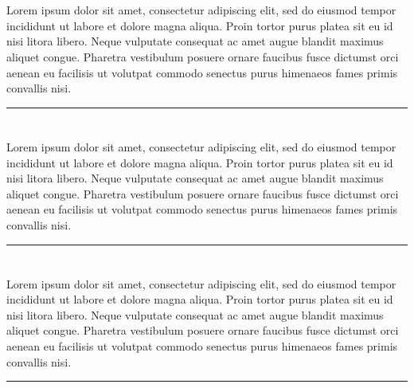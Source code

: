 \documentclass[12pt, letterpaper]{article}
\begin{document}
\section*{}
\noindent Lorem ipsum dolor sit amet, consectetur adipiscing elit, sed do eiusmod tempor incididunt ut labore et dolore magna aliqua. Proin tortor purus platea sit eu id nisi litora libero. Neque vulputate consequat ac amet augue blandit maximus aliquet congue. Pharetra vestibulum posuere ornare faucibus fusce dictumst orci aenean eu facilisis ut volutpat commodo senectus purus himenaeos fames primis convallis nisi\cite{9494653}.

\rule{\textwidth}{0.5pt}

\section*{}
\noindent Lorem ipsum dolor sit amet, consectetur adipiscing elit, sed do eiusmod tempor incididunt ut labore et dolore magna aliqua. Proin tortor purus platea sit eu id nisi litora libero. Neque vulputate consequat ac amet augue blandit maximus aliquet congue. Pharetra vestibulum posuere ornare faucibus fusce dictumst orci aenean eu facilisis ut volutpat commodo senectus purus himenaeos fames primis convallis nisi.

\rule{\textwidth}{0.5pt}

\section*{}
\noindent Lorem ipsum dolor sit amet, consectetur adipiscing elit, sed do eiusmod tempor incididunt ut labore et dolore magna aliqua. Proin tortor purus platea sit eu id nisi litora libero. Neque vulputate consequat ac amet augue blandit maximus aliquet congue. Pharetra vestibulum posuere ornare faucibus fusce dictumst orci aenean eu facilisis ut volutpat commodo senectus purus himenaeos fames primis convallis nisi.

\rule{\textwidth}{0.5pt}

\printbibliography[title={\centering References}]
\end{document}
